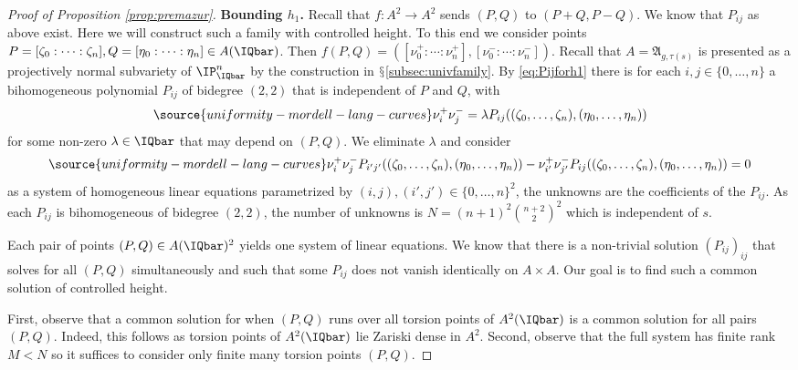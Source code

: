\begin{proof}[Proof of Proposition \ref{prop:premazur}]
  \textbf{Bounding $h_1$.}\label{page:boundh1} %
  Recall that $f\colon A^2\rightarrow A^2$ sends $(P,Q)$ to
  $(P+Q,P-Q)$. We know that $P_{ij}$ as above exist. Here we will
  construct such a family with controlled height. To this end we
  consider points $P=[\zeta_0:\cdots:\zeta_n],Q=[\eta_0:\cdots:\eta_n]
  \in A(\IQbar)$. Then $f(P,Q) = ([\nu^+_0:\cdots
  :\nu^+_n],[\nu^-_0:\cdots:\nu^-_n])$. Recall that
  $A=\mathfrak{A}_{g,\tau(s)}$ is presented as a projectively normal
  subvariety of $\IP^n_\IQbar$ by the construction in
  $\mathsection$\ref{subsec:univfamily}. By \eqref{eq:Pijforh1}  there
  is for each $i,j\in \{0,\ldots,n\}$
  a bihomogeneous polynomial $P_{ij}$ of bidegree $(2,2)$ that is
  independent of $P$ and $Q$, with
  \begin{equation}
    \label{eq:inhomlinearsystemforh1}
\source{uniformity-mordell-lang-curves}
    \nu^+_i \nu^-_j = \lambda P_{ij}((\zeta_0,\ldots,\zeta_n),(\eta_0,\ldots,\eta_n))
  \end{equation}
  for some non-zero $\lambda\in\IQbar$ that may depend on $(P,Q)$.
  We  eliminate $\lambda$ and consider
  \begin{equation}
    \label{eq:linearsystemforh1}
\source{uniformity-mordell-lang-curves}
    \nu^+_i \nu^-_jP_{i'j'}((\zeta_0,\ldots,\zeta_n),(\eta_0,\ldots,\eta_n)) - \nu^+_{i'} \nu^-_{j'}P_{ij}((\zeta_0,\ldots,\zeta_n),(\eta_0,\ldots,\eta_n))=0
  \end{equation}
  as a system of homogeneous linear equations
  parametrized by $(i,j),(i',j')\in \{0,\ldots,n\}^2$, the unknowns are
  the coefficients of the $P_{ij}$. As each $P_{ij}$ is bihomogeneous
  of bidegree $(2,2)$, the number of unknowns is
  $N=(n+1)^2 {n+2 \choose 2}^2$ which is independent of $s$.

  Each pair of points $(P,Q)\in A(\IQbar)^2$ yields one system of
  linear equations.
  We know that there is a non-trivial solution $(P_{ij})_{ij}$ that solves for all
  $(P,Q)$ simultaneously and such that some $P_{ij}$ does not vanish
  identically on $A\times A$. Our goal is to find such a common solution of
  controlled height.

  First, observe that a common solution  for when
  $(P,Q)$ runs over all torsion points of $A^2(\IQbar)$ is a common
  solution for all pairs $(P,Q)$. Indeed, this follows as torsion
  points of $A^2(\IQbar)$ lie Zariski dense in $A^2$.
  Second, observe that the full system has finite rank $M< N$ so it
  suffices to consider only finite many torsion points $(P,Q)$.


\end{proof}
